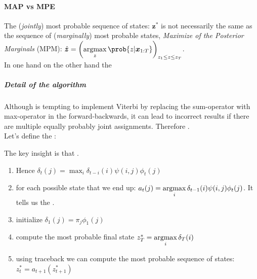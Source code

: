 \paragraph{MAP vs MPE}
The (\emph{jointly}) most probable sequence of states: $\bm{z}^{*}$ is not necessarily the same as 
the sequence of (\emph{marginally}) most probable states, \emph{Maximize of the Posterior Marginals}
(MPM): $\hat{\bm{z}}=\left(\displaystyle\argmax_{
z} \prob{z|\bm{x}_{1:T}}\right)_{z_{1}\leq z\leq z_{T}}$.\\
In one hand  on the other hand
the 
\subparagraph{Detail of the algorithm}
Although is tempting to implement Viterbi by replacing the sum-operator with max-operator in the
forward-backwards, it can lead to incorrect results if there are multiple equally probably joint
assignments. Therefore .\\
Let's define the :
\begin{center}
\end{center}
The key insight is that .
\begin{enumerate}
    \item Hence $\delta_{t}(j) = \displaystyle\max_{i}\delta_{t-i}(i)\psi(i,j)\phi_{t}(j)$
    \item {} for each possible state that we end 
        up: $a_{t}(j) = \displaystyle\operatorname*{argmax}_{i}\delta_{t-1}(i)\psi(i,j)\phi_{t}(j)$. It tells us the
        .
    \item initialize $\delta_{1}(j)=\pi_{j}\phi_{1}(j)$
    \item compute the most probable final state $z_{T}^{*}=\displaystyle\operatorname*{argmax}_{i}\delta_{T}(i)$
    \item using traceback we can compute the most probable sequence of states: $z_{t}^{*}=a_{t+1}(
        z^{*}_{t+1})$
\end{enumerate}

